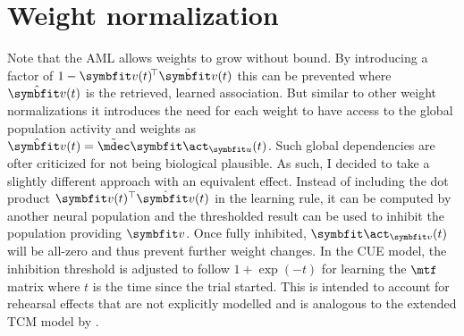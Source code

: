 \section{Weight normalization}
Note that the AML allows weights to grow without bound.
By introducing a factor of $1 - \vc v(t)\!\Tr \hat{\vc v}(t)$ this can be prevented where $\hat{\vc v}(t)$ is the retrieved, learned association.
But similar to other weight normalizations it introduces the need for each weight to have access to the global population activity and weights as $\hat{\vc v}(t) = \tilde{\mdec} \vc\act_{\vc u}(t)$.
Such global dependencies are ofter criticized for not being biological plausible.
As such, I decided to take a slightly different approach with an equivalent effect.
Instead of including the dot product $\vc v(t)\Tr \hat{\vc v}(t)$ in the learning rule, it can be computed by another neural population and the thresholded result can be used to inhibit the population providing $\vc v$.
Once fully inhibited, $\vc\act_{\vc v}(t)$ will be all-zero and thus prevent further weight changes.
In the CUE model, the inhibition threshold is adjusted to follow $1 + \exp(-t)$ for learning the $\mtf$ matrix where $t$ is the time since the trial started.
This is intended to account for rehearsal effects that are not explicitly modelled and is analogous to the extended TCM model by \textcite{Sederberg2008}.
